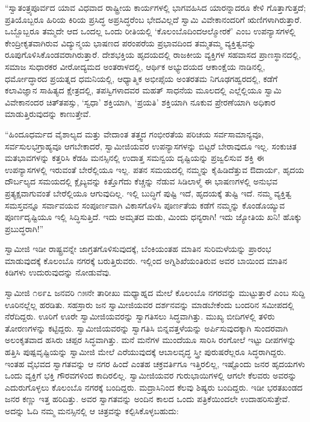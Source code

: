  “ಸ್ವಾತಂತ್ರ್ಯಪೂರ್ವದ ಯಾವ ವಿಧವಾದ ರಾಷ್ಟ್ರೀಯ ಕಾರ್ಯಗಳಲ್ಲಿ ಭಾಗವಹಿಸಿದ ಯಾರನ್ನಾದರೂ ಕೇಳಿ ಗೊತ್ತಾಗುತ್ತದೆ; ಪ್ರತಿಯೊಬ್ಬರೂ ಹಿರಿಯ ಕಿರಿಯ ಪ್ರಸಿದ್ಧ ಅಪ್ರಸಿದ್ಧರೆಂಬ ಭೇದವಿಲ್ಲದೆ ಸ್ವಾಮಿ ವಿವೇಕಾನಂದರಿಗೆ ಋಣಿಗಳಾಗಿರುತ್ತಾರೆ. ಒಬ್ಬೊಬ್ಬರೂ ತಮ್ಮದೇ ಆದ ಒಂದಲ್ಲ ಒಂದು ರೀತಿಯಲ್ಲಿ ‘ಕೊಲಂಬೊದಿಂದ\break ಆಲ್ಮೋರಕೆ’ ಎಂಬ ಉಪನ್ಯಾಸಗಳಲ್ಲಿ ಕೇಂದ್ರೀಕೃತವಾಗಿರುವ ವಿದ್ಯುನ್ಮಯ ಭಾಷಣದ ಪರಂಪರೆಯ ಪ್ರಭಾವದಿಂದ ತಮ್ಮತಮ್ಮ ವ್ಯಕ್ತಿತ್ವವನ್ನು ರೂಪುಗೊಳಿಸಿಕೊಂಡವರಾಗಿರುತ್ತಾರೆ. ದೇಶಭಕ್ತಿಯ ಹೃದಯದಲ್ಲಿ ರಾಜಕೀಯ ವ್ಯಕ್ತಿಗಳ ಸಹವಾಸದ ಪ್ರಾಣಸ್ಥಾನದಲ್ಲಿ, ಸಮಾಜ ಸುಧಾರಕರ ವೀರೋದ್ಯಮದ ಅಂತರಾಳದಲ್ಲಿ, ಆರ್ಥಿಕ ಅಭ್ಯುದಯದ ಆಕಾಂಕ್ಷೆಯ ನಾಡಿನಲ್ಲಿ, ಧರ್ಮೋದ್ಧಾರದ ಪ್ರಯತ್ನದ ಧಮನಿಯಲ್ಲಿ, ಆಧ್ಯಾತ್ಮಿಕ ಅಭೀಪ್ಸೆಯ ಅಂತರತಮ ನಿಗೂಢಗಹ್ವರದಲ್ಲಿ, ಕಡೆಗೆ ಕಲಾವಿಜ್ಞಾನ ಸಾಹಿತ್ಯದ ಕ್ಷೇತ್ರದಲ್ಲಿ, ತಪಸ್ವಿಗಳಾದವರ ಮಹತ್ ಸಾಧನೆಯ ಮೂಲದಲ್ಲಿ ಎಲ್ಲೆಲ್ಲಿಯೂ ಸ್ವಾಮಿ ವಿವೇಕಾನಂದರ ಚಿತ್‍ತಪಸ್ಸು, ‘ಸ್ವಧಾ’ ಶಕ್ತಿಯಾಗಿ, ‘ಪ್ರಯತಿ’ ಶಕ್ತಿಯಾಗಿ ನೂಕುವ ಪ್ರೇರಣೆಯಾಗಿ ಅಧಿಕಾರ ಮಾಡುತ್ತಿರುವುದನ್ನು ಕಾಣುತ್ತೇವೆ. 

\newpage

 “ಹಿಂದೂಧರ್ಮದ ವೈಶಾಲ್ಯದ ಮತ್ತು ವೇದಾಂತ ತತ್ತ್ವದ ಗಂಭೀರತೆಯ ಪರಿಚಯ ಸರ್ವಸಾಮಾನ್ಯವೂ, ಸರ್ವಸುಲಭಗ್ರಾಹ್ಯವೂ ಆಗಬೇಕಾದರೆ, ಸ್ವಾಮೀಜಿಯವರ ಉಪನ್ಯಾಸಗಳನ್ನು ಬಿಟ್ಟರೆ ಬೇರಾವುದೂ ಇಲ್ಲ. ಸಂಕುಚಿತ ಮತಭಾವಗಳನ್ನು ಕತ್ತರಿಸಿ ಕೆಡಹಿ ಮನಸ್ಸಿನಲ್ಲಿ ಉದಾತ್ತ ಸಮನ್ವಯ ದೃಷ್ಟಿಯನ್ನು ಪ್ರಜ್ವಲಿಸುವ ಶಕ್ತಿ ಈ ಉಪನ್ಯಾಸಗಳಲ್ಲಿ ಇರುವಂತೆ ಬೇರೆಲ್ಲಿಯೂ ಇಲ್ಲ. ಪತನ ಸಮಯದಲ್ಲಿ ನಮ್ಮನ್ನು ಕೈಹಿಡಿದೆತ್ತುವ ಔದಾರ್ಯ, ಹೃದಯ ದೌರ್ಬಲ್ಯದ ಸಮಯದಲ್ಲಿ ಕ್ಲೈಬ್ಯವನ್ನು ಕಿತ್ತೊಗೆದು ಕೆಚ್ಚನ್ನು ನೆಡುವ ಸಿಡಿಲಾಳ್ಮೆ ಈ ಭಾಷಣಗಳಲ್ಲಿ ಅನುಭವ ಪ್ರತ್ಯಕ್ಷವಾಗುವಂತೆ ಬೇರೆಲ್ಲಿಯೂ ಆಗುವುದಿಲ್ಲ. ಇಲ್ಲಿ ಬುದ್ಧಿಗೆ ಪುಷ್ಟಿ ಇದೆ, ಹೃದಯಕ್ಕೆ ತುಷ್ಟಿ ಇದೆ. ನಮ್ಮ ವ್ಯಕ್ತಿತ್ವ ಸಮಸ್ತವನ್ನೂ ಸರ್ವಾವಯವ ಸಂಪೂರ್ಣವಾಗಿ ವಿಕಾಸಗೊಳಿಸಿ ಪೂರ್ಣತೆಯ ಕಡೆಗೆ ನಮ್ಮನ್ನು ಕೊಂಡೊಯ್ಯುವ ಪೂರ್ಣದೃಷ್ಟಿಯೂ ಇಲ್ಲಿ ಸಿದ್ಧಿಸುತ್ತಿದೆ. ಇದು ಅಮೃತದ ಮಡು, ಮಿಂದು ಧನ್ಯರಾಗಿ! ಇದು ಜ್ಯೋತಿಯ ಖನಿ! ಹೊಕ್ಕು ಪ್ರಬುದ್ಧರಾಗಿ!” 

 ಸ್ವಾಮೀಜಿ ಇಡೀ ರಾಷ್ಟ್ರವನ್ನೇ ಜಾಗ್ರತಗೊಳಿಸುವುದಕ್ಕೆ, ಬೆಂಕಿಯಂತಹ ಮಾತಿನ ಸುರಿಮಳೆಯನ್ನು ಪ್ರಾರಂಭ ಮಾಡುವುದಕ್ಕೆ ಕೊಲಂಬೊ ನಗರಕ್ಕೆ ಬರುತ್ತಿರುವರು. ಇಲ್ಲಿಂದ ಅಗ್ನಿಶಿಖೆಯಂತಿರುವ ಅವರ ಬಾಯಿಂದ ಮಾತಿನ ಕಿಡಿಗಳು ಉದುರುವುದನ್ನು ನೋಡುವೆವು. 

 ಸ್ವಾಮೀಜಿ ೧೮೯೭ ಜನವರಿ ೧೫ನೇ ತಾರೀಖು ಮಧ್ಯಾಹ್ನದ ಮೇಲೆ ಕೊಲಂಬೊ ನಗರವನ್ನು ಮುಟ್ಟುತ್ತಾರೆ ಎಂಬ ಸುದ್ದಿ ಊರಿನಲ್ಲೆಲ್ಲ ಹರಡಿತು. ಸಹಸ್ರಾರು ಜನ ಸ್ವಾಮೀಜಿಯವರ ದರ್ಶನವನ್ನು ಮಾಡಬೇಕೆಂದು ಬಂದರಿನ ಸಮೀಪದಲ್ಲಿ ನೆರೆದಿದ್ದರು. ಊರಿಗೆ ಊರೇ ಸ್ವಾಮೀಜಿಯವರನ್ನು ಸ್ವಾಗತಿಸಲು ಸಿದ್ಧವಾಗಿತ್ತು. ಮುಖ್ಯ ಬೀದಿಗಳಲ್ಲಿ ತಳಿರು ತೋರಣಗಳನ್ನು ಕಟ್ಟಿದ್ದರು. ಸ್ವಾಮೀಜಿಯವರನ್ನು ಸ್ವಾಗತಿಸಿ ಬಿನ್ನವತ್ತಳೆಯನ್ನು ಅರ್ಪಿಸುವುದಕ್ಕಾಗಿ ಸುಂದರವಾಗಿ ಅಲಂಕೃತವಾದ ಹಸಿರು ಚಪ್ಪರ ಸಿದ್ಧವಾಗಿತ್ತು. ಮನೆ ಮನೆಗಳ ಮುಂದೆಯೂ ಸಾರಿಸಿ ರಂಗೋಲೆ ಇಟ್ಟು ದೀಪಗಳನ್ನು ಹತ್ತಿಸಿ ಪುಷ್ಪವೃಷ್ಟಿಯನ್ನು ಸ್ವಾಮೀಜಿ ಮೇಲೆ ಎರೆಯುವುದಕ್ಕೆ ಆಬಾಲವೃದ್ಧ ಸ್ತ್ರೀ ಪುರುಷರೆಲ್ಲರೂ ಸಿದ್ಧರಾಗಿದ್ದರು. ಇಂತಹ ವೈಭವದ ಸ್ವಾಗತವನ್ನು ಆ ನಗರ ಹಿಂದೆ ಎಂತಹ ಚಕ್ರವರ್ತಿಗೂ ಇತ್ತಿರಲಿಲ್ಲ, ಇಷ್ಟೊಂದು ಜನರ ಹೃದಯಗಳು ಒಂದು ವ್ಯಕ್ತಿಗೆ ಭಕ್ತಿ ಗೌರವಗಳಿಂದ ಕಾದಿರಲಿಲ್ಲ. ಸ್ವಾಮೀಜಿಯವರ ಗುರುಭಾಯಿಗಳಲ್ಲಿ ಆಗಲೇ ಕೆಲವರು ಅವರನ್ನು ಎದುರುಗೊಳ್ಳಲು ಕೊಲಂಬೊ ನಗರಕ್ಕೆ ಬಂದಿದ್ದರು. ಮದ್ರಾಸಿನಿಂದ ಕೆಲವು ಶಿಷ್ಯರು ಬಂದಿದ್ದರು. ಇಡೀ ಭರತಖಂಡದ ಜನರ ಕಣ್ಣು ಇತ್ತ ಹರಿದಿತ್ತು. ಅವರ ಸ್ವಾಗತವನ್ನು ಅಂದಿನ ಕಾಲದ ಒಂದು ಪತ್ರಿಕೆಯಿಂದಲೇ ಉದಾಹರಿಸುತ್ತೇವೆ. ಅದನ್ನು ಓದಿ ನಮ್ಮ ಮನಸ್ಸಿನಲ್ಲಿ ಆ ಚಿತ್ರವನ್ನು ಕಲ್ಪಿಸಿಕೊಳ್ಳಬಹುದು: 

